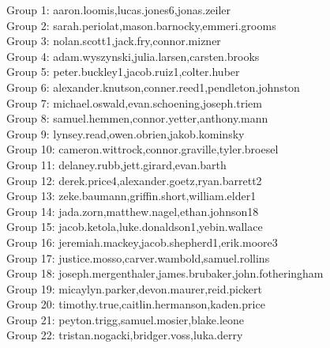 \documentclass[10pt]{beamer}
\begin{document}
\begin{frame}
\footnotesize
Group 1: aaron.loomis,lucas.jones6,jonas.zeiler\\
Group 2: sarah.periolat,mason.barnocky,emmeri.grooms\\
Group 3: nolan.scott1,jack.fry,connor.mizner\\
Group 4: adam.wyszynski,julia.larsen,carsten.brooks\\
Group 5: peter.buckley1,jacob.ruiz1,colter.huber\\
Group 6: alexander.knutson,conner.reed1,pendleton.johnston\\
Group 7: michael.oswald,evan.schoening,joseph.triem\\
Group 8: samuel.hemmen,connor.yetter,anthony.mann\\
Group 9: lynsey.read,owen.obrien,jakob.kominsky\\
Group 10: cameron.wittrock,connor.graville,tyler.broesel\\
Group 11: delaney.rubb,jett.girard,evan.barth\\
Group 12: derek.price4,alexander.goetz,ryan.barrett2\\
Group 13: zeke.baumann,griffin.short,william.elder1\\
Group 14: jada.zorn,matthew.nagel,ethan.johnson18\\
Group 15: jacob.ketola,luke.donaldson1,yebin.wallace\\
Group 16: jeremiah.mackey,jacob.shepherd1,erik.moore3\\
Group 17: justice.mosso,carver.wambold,samuel.rollins\\
Group 18: joseph.mergenthaler,james.brubaker,john.fotheringham\\
Group 19: micaylyn.parker,devon.maurer,reid.pickert\\
Group 20: timothy.true,caitlin.hermanson,kaden.price\\
Group 21: peyton.trigg,samuel.mosier,blake.leone\\
Group 22: tristan.nogacki,bridger.voss,luka.derry\\\end{frame}
\end{document}
